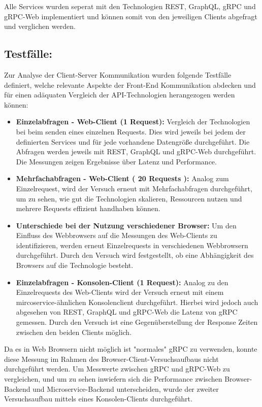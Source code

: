 Alle Services wurden seperat mit den Technologien REST, GraphQL, gRPC und gRPC-Web implementiert und können somit von den jeweiligen Clients abgefragt und verglichen werden.

\subsection*{Testfälle:}
Zur Analyse der Client-Server Kommunikation wurden folgende Testfälle definiert, welche relevante Aspekte der Front-End Kommunikation abdecken und für einen adäquaten Vergleich der API-Technologien herangezogen werden können: 
\begin{itemize}
	\item \textbf{Einzelabfragen - Web-Client (1 Request):} Vergleich der Technologien bei beim senden eines einzelnen Requests. Dies wird jeweils bei jedem der definierten Services und für jede vorhandene Datengröße durchgeführt. Die Abfragen werden jeweils mit REST, GraphQL und gRPC-Web durchgeführt. Die Messungen zeigen Ergebnisse über Latenz und Performance.
	\item \textbf{Mehrfachabfragen - Web-Client ( 20 Requests ):} Analog zum Einzelrequest, wird der Versuch erneut mit Mehrfachabfragen durchgeführt, um zu sehen, wie gut die Technologien skalieren, Ressourcen nutzen und mehrere Requests effizient handhaben können.  
	\item \textbf{Unterschiede bei der Nutzung verschiedener Browser:} Um den Einfluss des Webbrowsers auf die Messungen des Web-Clients zu identifizieren, werden erneut Einzelrequests in verschiedenen Webbrowsern durchgeführt. Durch den Versuch wird festgestellt, ob eine Abhängigkeit des Browsers auf die Technologie besteht.
	\item \textbf{Einzelabfragen - Konsolen-Client (1 Request):} Analog zu den Einzelrequests des Web-Clients wird der Versuch erneut mit einem mircoservice-ähnlichen Konsolenclient durchgeführt. Hierbei wird jedoch auch abgesehen von REST, GraphQL und gRPC-Web die Latenz von gRPC gemessen. Durch den Versuch ist eine Gegenüberstellung der Response Zeiten zwischen den beiden Clients möglich.
\end{itemize}

Da es in Web Browsern nicht möglich ist "normales" gRPC zu verwenden, konnte diese Messung im Rahmen des Browser-Client-Versuchsaufbaus nicht durchgeführt werden. Um Messwerte zwischen gRPC und gRPC-Web zu vergleichen, und um zu sehen inwiefern sich die Performance zwischen Browser-Backend und Microservice-Backend unterscheiden, wurde der zweiter Versuchsaufbau mittels eines Konsolen-Clients durchgeführt.

